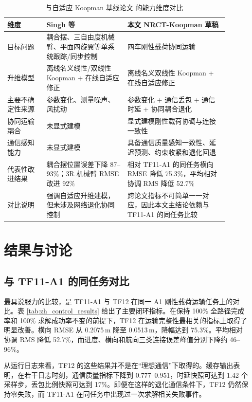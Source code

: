 \documentclass[twocolumn,3p,times,procedia]{elsarticle}
\newcommand{\methodname}{NRCT-Koopman}
\newcommand{\tfone}{TF11-A1}
\newcommand{\tftwo}{TF12}
\begin{document}
\begin{table}[t]
\footnotesize
\centering
\begin{threeparttable}
\setlength{\abovecaptionskip}{0pt}
\caption{与自适应 Koopman 基线论文 \cite{singh2024adaptive} 的能力维度对比}
\label{tab:zh_capability_compare}
\begin{tabular}{p{0.16\linewidth} p{0.33\linewidth} p{0.41\linewidth}}
\toprule
维度 & Singh 等 \cite{singh2024adaptive} & 本文 \methodname{} 草稿 \\
\midrule
目标问题 & 耦合摆、三自由度机械臂、平面四旋翼等单系统跟踪/同步控制 & 四车刚性载荷协同运输 \\
升维模型 & 离线名义线性/双线性 Koopman + 在线自适应修正 & 离线名义双线性 Koopman + 在线自适应修正 \\
主要不确定性来源 & 参数变化、测量噪声、风扰动 & 参数变化 + 通信丢包 + 通信时延 + 协同耦合退化 \\
协同运输耦合 & 未显式建模 & 显式建模刚性载荷协调与连接一致性 \\
通信感知能力 & 未显式建模 & 具备通信质量感知一致性、延迟预测、约束收紧和退化回退 \\
代表性改进结果 & 耦合摆位置误差下降 87--93\%；3R 机械臂 RMSE 改进 92\% & 相对 \tfone{} 的同任务横向 RMSE 降低 75.3\%，平均相对协调 RMS 降低 52.7\% \\
对比说明 & 强调自适应升维建模，但未涉及网络退化协同控制 & 跨论文指标不可简单一一对应，因此本文主结论依赖与 \tfone{} 的同任务比较 \\
\bottomrule
\end{tabular}
\end{threeparttable}
\end{table}

\section{结果与讨论}
\subsection{与 \tfone{} 的同任务对比}
最具说服力的比较，是 \tfone{} 与 \tftwo{} 在同一 A1 刚性载荷运输任务上的对比。表 \ref{tab:zh_control_results} 给出了主要闭环指标。在保持 100\% 全路径完成率和 100\% 求解成功率不变的前提下，\tftwo{} 在运输完整性最相关的指标上取得了明显改善。横向 RMSE 从 0.2075\,m 降至 0.0513\,m，降幅达到 75.3\%。平均相对协调 RMS 降低 52.7\%，而进度、横向和航向三类连接误差峰值分别下降约 46--96\%。

从运行日志来看，\tftwo{} 的这些结果并不是在“理想通信”下取得的。缓存输出表明，在若干日志时刻，通信质量指标下降到 0.777--0.951，时延快照可达到 1.42 个采样步，丢包比例快照可达到 17\%。即便在这样的退化通信条件下，\tftwo{} 仍然保持零失败，而 \tfone{} 在同任务中出现过一次求解相关失败事件。
\end{document}
